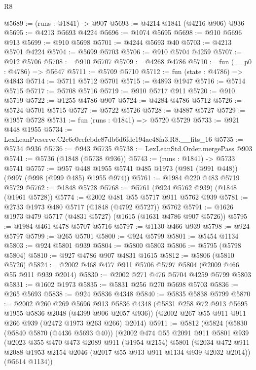\begin{lexlean}{R8}
\begin{coremodule}
@5689 := (runs : @1841) -> @907
@5693 := @4214 @1841 (@4216 @906) @936
@5695 := @4213 @5693 @4224
@5696 := @1074 @5695
@5698 := @910 @5696 @913
@5699 := @910 @5698
@5701 := @4244 @5693 @40
@5703 := @4213 @5701 @4224
@5704 := @5699 @5703
@5706 := @910 @5704 @4259
@5707 := @912 @5706
@5708 := @910 @5707
@5709 := @4268 @4786
@5710 := fun (__p0 : @4786) => @5647
@5711 := @5709 @5710
@5712 := fun (state : @4786) => @4843
@5714 := @5711 @5712 @5701
@5715 := @4893 @1947
@5716 := @5714 @5715
@5717 := @5708 @5716
@5719 := @910 @5717 @911
@5720 := @910 @5719
@5722 := @1255 @4786 @907
@5724 := @4284 @4786 @5712
@5726 := @5724 @5701 @5715
@5727 := @5722 @5726
@5728 := @4887 @5727
@5729 := @1957 @5728
@5731 := fun (runs : @1841) => @5720 @5729
@5733 := @921 @448 @1955
@5734 := LexLeanPreserve.C2c6c0ccfcbdc87db6d6fdc194ae48fa3.R8.__fits_16
@5735 := @5734 @936
@5736 := @943 @5735
@5738 := LexLeanStd.Order.mergePass @903
@5741 := @5736 (@1848 (@5738 @936))
@5743 := (runs : @1841) -> @5733 @5741
@5757 := @957 @448 @1955 @5741 @485 @1973 (@981 (@991 @448)) (@997 (@998 (@999 @485) @1955 @974))
@5761 := @1984 @220 @483 @5719 @5729
@5762 := @1848 @5728
@5768 := @5761 (@924 @5762 @939) (@1848 (@1961 @5728))
@5774 := @2002 @481 @55 @5717 @911 @5762 @939
@5781 := @2733 @1973 @480 @5717 (@1848 (@4792 @5727)) @5762
@5791 := @1626 @1973 @479 @5717 (@4831 @5727) (@1615 (@1631 @4786 @907 @5726))
@5795 := @1984 @461 @478 @5707 @5716
@5797 := @1130 @466 @939
@5798 := @924 @5797
@5799 := @265 @5701
@5800 := @924 @5799
@5801 := @5454 @1134
@5803 := @924 @5801 @939
@5804 := @5800 @5803
@5806 := @5795 (@5798 @5804)
@5810 := @927 @4786 @907 @4831 @1615
@5812 := @5806 (@5810 @5726)
@5824 := @2002 @468 @477 @911 @5706 @5797 @5804 (@2009 @466 @55 @911 @939 @2014)
@5830 := @2002 @271 @476 @5704 @4259 @5799 @5803
@5831 := @1602 @1973
@5835 := @5831 @256 @270 @5698 @5703
@5836 := @265 @5693
@5838 := @924 @5836 @4348
@5840 := @5835 @5838 @5799
@5870 := @2002
    @260
    @269
    @5696
    @913
    @5836
    @4348
    (@5831 @258 @72 @913 @5695 @1955 @5836 @2048 (@4399 @906 @2057 @936))
    (@2002 @267 @55 @911 @911 @266 @939 (@2472 @1973 @263 @266) @2014)
@5911 := @5812
    (@5824
      (@5830
        (@5840 @5870 (@4436 @5693 @40))
        (@2002
          @474
          @55
          @2091
          @911
          @5801
          @939
          (@2023
            @355
            @470
            @473
            @2089
            @911
            (@1954 @2154)
            @5801
            (@2034 @472 @911 @2088 @1953 @2154 @2046 (@2017 @55 @913 @911 @1134 @939 @2032 @2014))
            (@5614 @1134))

\end{coremodule}
\end{lexlean}
